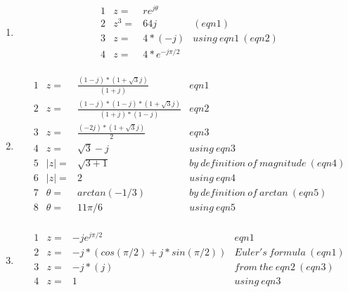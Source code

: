 \documentclass[10pt,a4paper, margin=1in]{article}
\begin{document}
\begin{enumerate}
\begin{enumerate}
    \item  
        \begin{align*}
        &1& z = & re^{j\theta} &\\
        &2& z^3 = & 64j & (eqn1)\\
        &3& z = & 4*(-j) & using\ eqn1\ (eqn2)\\
        &4& z = & 4*e^{-j\pi/2} & \\
        \end{align*}
    \item 
        \begin{align*}
        &1& z = & \frac{(1-j)*(1+\sqrt{3}j)}{(1+j)} & eqn1\\
        &2& z = & \frac{(1-j)*(1-j)*(1+\sqrt{3}j)}{(1+j)*(1-j)} & eqn2\\
        &3& z = & \frac{(-2j)*(1+\sqrt{3}j)}{2} & eqn3\\
        &4& z = & \sqrt{3}-j & using\ eqn3 \\
        &5& |z| = & \sqrt{3+1} & by\ definition\ of\ magnitude\ (eqn4) \\
        &6& |z| = & 2 & using\ eqn4 \\
        &7& \theta = & arctan(-1/3) & by\ definition\ of\ arctan\ (eqn5)\\
        &8& \theta = & 11\pi/6 & using\ eqn5 \\
        \end{align*}
    \item 
        \begin{align*}
        &1& z = & -je^{j\pi/2} & eqn1\\
        &2& z = & -j*(cos(\pi/2) + j*sin(\pi/2)) & Euler's\ formula\ (eqn1) \\
        &3& z = & -j*(j) & from\ the\ eqn2\ (eqn3) \\
        &4& z = & 1 & using\ eqn3 \\
        \end{align*}
    \end{enumerate}



\end{enumerate}
\end{document}
